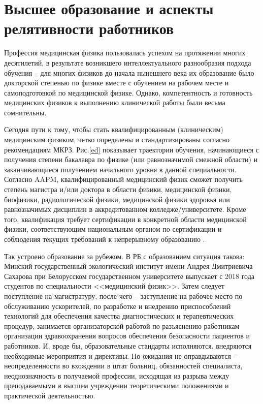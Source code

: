 
\section{Высшее образование и аспекты релятивности работников}
Профессия медицинская физика пользовалась успехом на протяжении многих десятилетий, в результате возникшего интеллектуального разнообразия подхода обучения -- для многих физиков до начала нынешнего века их образование было докторской степенью по физике вместе с обучением на рабочем месте и самоподготовкой по медицинской физике.  Однако, компетентность и готовность медицинских физиков к выполнению клинической работы были весьма сомнительны. 

Сегодня пути к тому, чтобы стать квалифицированным (клиническим) медицинским физиком, четко определены и стандартизированы согласно рекомендациям МКРЗ. Рис.\ref{ed} показывает траектории обучения, начинающиеся с получения степени бакалавра по физике (или равнозначимой смежной области) и заканчивающиеся получением начального уровня в данной специальности.
Согласно AAPM, квалифицированный медицинский физик сможет получить степень магистра и/или доктора в области физики, медицинской физики, биофизики, радиологической физики, медицинской физики здоровья или равнозначимых дисциплин в аккредитованном колледже/университете. Кроме того, квалификация требует сертификации в конкретной области медицинской физики, соответствующим национальным органом по сертификации и соблюдения текущих требований к непрерывному образованию \cite{AAPM 2016b}. 

Так устроено образование за рубежом. В РБ с образованием ситуация такова: Минский государственный экологический институт имени Андрея Дмитриевича Сахарова при Белорусском государственном университете выпускает с 2018 года студентов по специальности <<медицинский физик>>. Затем следует поступление на магистратуру, после чего -- заступление на рабочее место по обслуживанию ускорителей, по разработке и внедрению приспособлений технологий для обеспечения качества диагностических и терапевтических процедур, занимается организаторской работой по разъяснению работникам организации здравоохранения вопросов обеспечения безопасности пациентов и работников. И, вроде бы, образовательные стандарты исполняются, внедряются необходимые мероприятия и директивы. Но ожидания не оправдываются -- неопределенности во вхождении в штат больниц, обязанностей специалиста, неоднозначность в получаемой профессии, исходящая из разрыва между преподаваемыми в высшем учреждении теоретическими положениями и практической деятельностью. 

